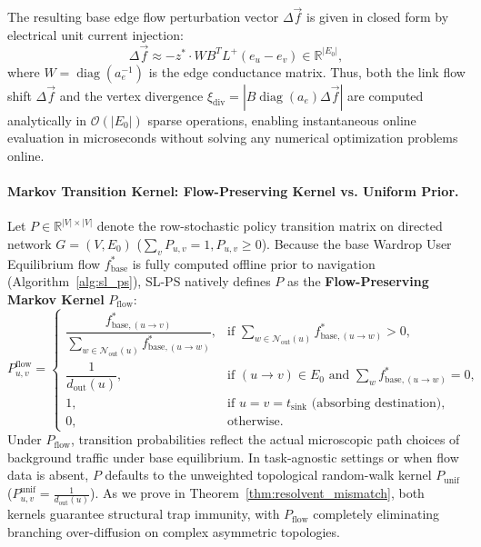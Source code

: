 \documentclass[11pt,a4paper]{article}
\begin{document}
The resulting base edge flow perturbation vector $\Delta \vec{f}$ is given in closed form by electrical unit current injection:
\begin{equation}
\label{eq:closed_form_delta_f}
\Delta \vec{f} \approx -z^* \cdot W B^T L^+ (e_u - e_v) \in \mathbb{R}^{|E_0|},
\end{equation}
where $W = \operatorname{diag}(a_e^{-1})$ is the edge conductance matrix. Thus, both the link flow shift $\Delta \vec{f}$ and the vertex divergence $\xi_{\text{div}} = |B \operatorname{diag}(a_e) \Delta \vec{f}|$ are computed analytically in $\mathcal{O}(|E_0|)$ sparse operations, enabling instantaneous online evaluation in microseconds without solving any numerical optimization problems online.

\paragraph{Markov Transition Kernel: Flow-Preserving Kernel vs. Uniform Prior.}
Let $P \in \mathbb{R}^{|V| \times |V|}$ denote the row-stochastic policy transition matrix on directed network $G = (V, E_0)$ ($\sum_v P_{u, v} = 1, P_{u, v} \ge 0$). Because the base Wardrop User Equilibrium flow $f_{\text{base}}^*$ is fully computed offline prior to navigation (Algorithm~\ref{alg:sl_ps}), SL-PS natively defines $P$ as the \textbf{Flow-Preserving Markov Kernel} $P_{\text{flow}}$:
\begin{equation}
\label{eq:flow_preserving_kernel}
P_{u, v}^{\text{flow}} = 
\begin{cases}
\dfrac{f_{\text{base}, (u \to v)}^*}{\sum_{w \in \mathcal{N}_{\text{out}}(u)} f_{\text{base}, (u \to w)}^*}, & \text{if } \sum_{w \in \mathcal{N}_{\text{out}}(u)} f_{\text{base}, (u \to w)}^* > 0, \\
\dfrac{1}{d_{\text{out}}(u)}, & \text{if } (u \to v) \in E_0 \text{ and } \sum_w f_{\text{base}, (u \to w)}^* = 0, \\
1, & \text{if } u = v = t_{\text{sink}} \text{ (absorbing destination)}, \\
0, & \text{otherwise}.
\end{cases}
\end{equation}
Under $P_{\text{flow}}$, transition probabilities reflect the actual microscopic path choices of background traffic under base equilibrium. In task-agnostic settings or when flow data is absent, $P$ defaults to the unweighted topological random-walk kernel $P_{\text{unif}}$ ($P_{u, v}^{\text{unif}} = \frac{1}{d_{\text{out}}(u)}$). As we prove in Theorem~\ref{thm:resolvent_mismatch}, both kernels guarantee structural trap immunity, with $P_{\text{flow}}$ completely eliminating branching over-diffusion on complex asymmetric topologies.
\end{document}
